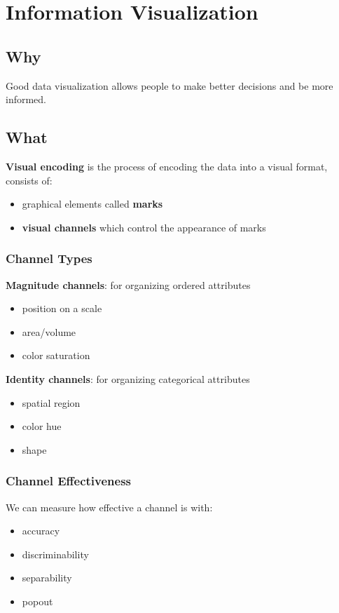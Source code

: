 \documentclass[]{article}
\theoremstyle{definition}
\begin{document}
	
	\section{Information Visualization}
	
	\subsection{Why}
	Good data visualization allows people to make better decisions and be more informed.

	\subsection{What}
	\textbf{Visual encoding} is the process of encoding the data into a visual format, consists of:
	\begin{itemize}
		\item graphical elements called \textbf{marks}
		\item \textbf{visual channels} which control the appearance of marks
	\end{itemize}

	\subsubsection{Channel Types}
	\textbf{Magnitude channels}: for organizing ordered attributes
	\begin{itemize}
		\item position on a scale
		\item area/volume
		\item color saturation
	\end{itemize}
	\textbf{Identity channels}: for organizing categorical attributes
	\begin{itemize}
		\item spatial region
		\item color hue
		\item shape
	\end{itemize}

	\subsubsection{Channel Effectiveness}
	We can measure how effective a channel is with:
	\begin{itemize}
		\item accuracy
		\item discriminability
		\item separability
		\item popout
	\end{itemize}
\end{document}

